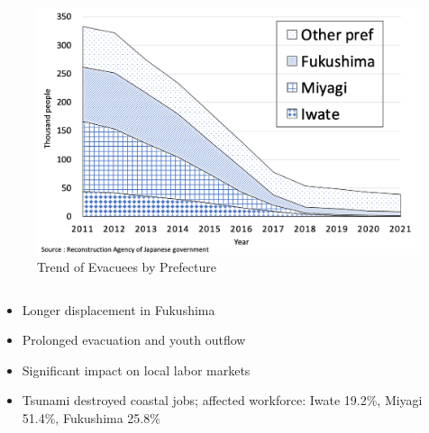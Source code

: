 \documentclass[serif, aspectratio=169]{beamer}
\begin{document}
\begin{frame}[label=evacuees_main]
\begin{columns}[T, onlytextwidth]
        \begin{column}{0.485\textwidth}
            \begin{figure}[ht]
                \centering
                \includegraphics[width=\textwidth]{evacuation.png}
                \caption{Trend of Evacuees by Prefecture}
                \label{fig:evacuees_trend}
            \end{figure}
        \end{column}
    \end{columns}
    


\begin{column}{0.49\textwidth}
    \raggedright
    \vspace{-2.5cm}
    \hspace{-1.1cm}
    \small{
        \begin{itemize}

            \item Longer displacement in Fukushima
            \item Prolonged evacuation and youth outflow
            \item Significant impact on local labor markets
            \item Tsunami destroyed coastal jobs; affected workforce: Iwate 19.2\%, Miyagi 51.4\%, Fukushima 25.8\%
        \end{itemize}
    }
\end{column}



\vspace{-0.5cm}



\end{frame}
\end{document}
